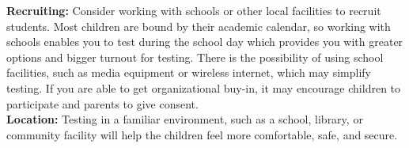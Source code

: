 \textbf{Recruiting:} Consider working with schools or other local facilities to recruit students. Most children are bound by their academic calendar, so working with schools enables you to test during the school day which provides you with greater options and bigger turnout for testing.  There is the possibility of using school facilities, such as media equipment or wireless internet, which may simplify testing.  If you are able to get organizational buy-in, it may encourage children to participate and parents to give consent\cite{testwithkids}.\\

\textbf{Location:} Testing in a familiar environment, such as a school, library, or community facility will help the children feel more comfortable, safe, and secure\cite{testwithkids}.\\
